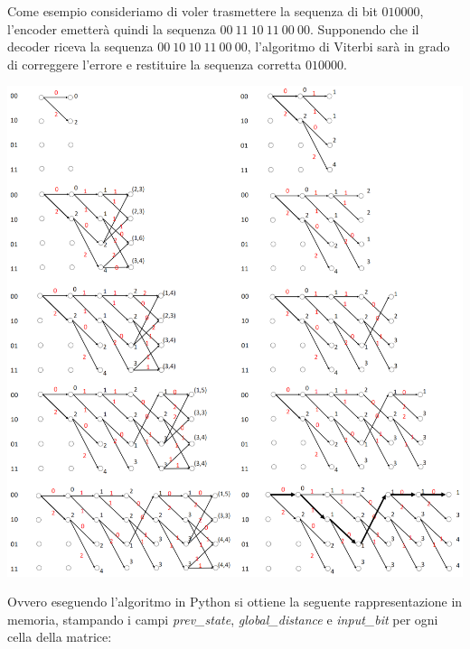 Come esempio consideriamo di voler trasmettere la sequenza di bit $010000$, l'encoder emetterà quindi la sequenza $00 \ 11 \ 10 \ 11 \ 00 \ 00$. Supponendo che il decoder riceva la sequenza $00 \ 10 \ 10 \ 11 \ 00 \ 00$, l'algoritmo di Viterbi sarà in grado di correggere l'errore e restituire la sequenza corretta $010000$.




\begin{center}
    \includegraphics[width=1\textwidth]{imgs/viterbi_example.png}
\end{center}


Ovvero eseguendo l'algoritmo in Python si ottiene la seguente rappresentazione in memoria, stampando i campi \textit{prev\_state}, \textit{global\_distance} e \textit{input\_bit} per ogni cella della matrice:


